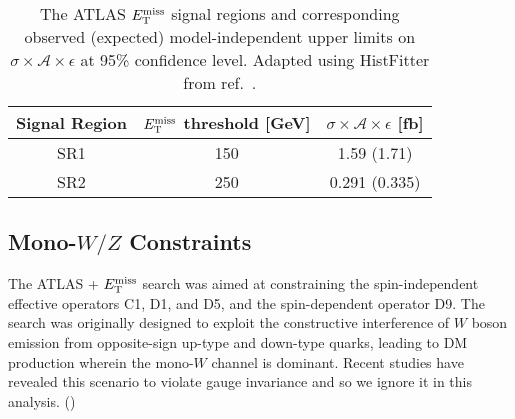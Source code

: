 \begin{table}[!htbp]
  \begin{center}
    \begin{tabular}{c|c|c}
      \hline
      \hline
      Signal Region & $E_{\mathrm{T}}^{\mathrm{miss}}$ threshold [GeV] & $\sigma \times \mathcal{A} \times \epsilon$ [fb] \\
      \hline
      SR1 & 150 & 1.59 (1.71) \\
      SR2 & 250 & 0.291 (0.335) \\
      \hline
      \hline
    \end{tabular}
  \end{center}
  \caption{The ATLAS \monoZ $E_{\mathrm{T}}^{\mathrm{miss}}$ signal regions and corresponding observed (expected) model-independent upper limits on $\sigma \times \mathcal{A} \times \epsilon$ at 95\% confidence level. Adapted using HistFitter from ref.~\cite{Aad:2014monoZlep}.}
  \label{tab:sigmalim_monoZ}
\end{table}

\subsection{Mono-$W/Z$ Constraints}
\label{monoWZ_constraints}

The ATLAS \monoWZ + $E_{\mathrm{T}}^{\mathrm{miss}}$ search \cite{Aad:2013monoWZ} was aimed at constraining the spin-independent effective operators C1, D1, and D5, and the spin-dependent operator D9. The search was originally designed to exploit the constructive interference of $W$ boson emission from opposite-sign up-type and down-type quarks, leading to DM production wherein the mono-$W$ channel is dominant. Recent studies \cite{Bell:gaugeInv} have revealed this scenario to violate gauge invariance and so we ignore it in this analysis. ()
%

